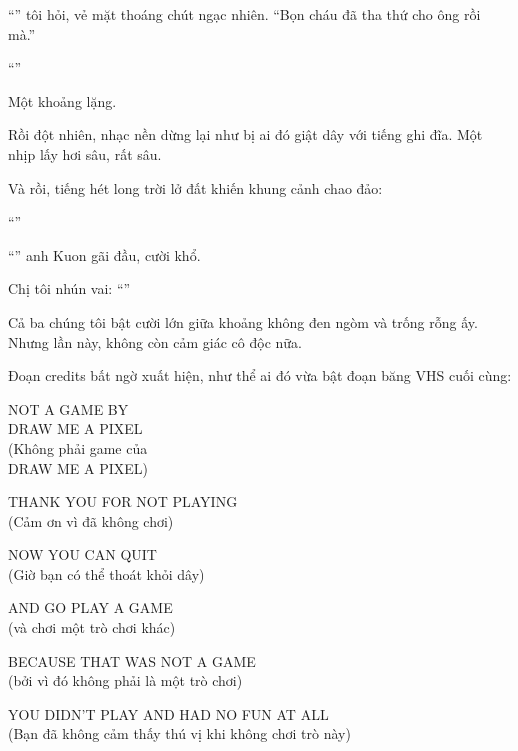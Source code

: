 \documentclass[../main.tex]{subfiles}
\begin{document}
``'' tôi hỏi, vẻ mặt thoáng chút ngạc nhiên. ``Bọn cháu đã tha thứ cho ông rồi mà.''

``''

Một khoảng lặng.

Rồi đột nhiên, nhạc nền dừng lại như bị ai đó giật dây với tiếng ghi đĩa. Một nhịp lấy hơi sâu, rất sâu.

Và rồi, tiếng hét long trời lở đất khiến khung cảnh chao đảo:

``''

``'' anh Kuon gãi đầu, cười khổ.

Chị tôi nhún vai: ``''

Cả ba chúng tôi bật cười lớn giữa khoảng không đen ngòm và trống rỗng ấy. Nhưng lần này, không còn cảm giác cô độc nữa.

\il

Đoạn credits bất ngờ xuất hiện, như thể ai đó vừa bật đoạn băng VHS cuối cùng:

\begin{center}
  NOT A GAME BY\\DRAW ME A PIXEL\\(Không phải game của\\DRAW ME A PIXEL)
\end{center}

\begin{center}
  THANK YOU FOR NOT PLAYING\\(Cảm ơn vì đã không chơi)
\end{center}

\begin{center}
  NOW YOU CAN QUIT\\(Giờ bạn có thể thoát khỏi dây)
\end{center}

\begin{center}
  AND GO PLAY A GAME\\(và chơi một trò chơi khác)
\end{center}

\begin{center}
  BECAUSE THAT WAS NOT A GAME\\(bởi vì đó không phải là một trò chơi)
\end{center}

\begin{center}
  YOU DIDN'T PLAY AND HAD NO FUN AT ALL\\(Bạn đã không cảm thấy thú vị khi không chơi trò này)
\end{center}
\end{document}

